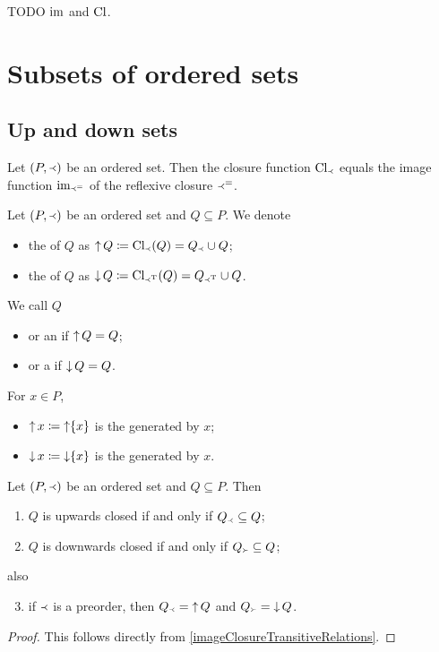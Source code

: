 TODO $\operatorname{im}$ and $\operatorname{Cl}$.

\section{Subsets of ordered sets}
\subsection{Up and down sets}
\begin{lemma} \label{imageClosureTransitiveRelations}
Let $\left( P, \Yleft \right)$ be an ordered set. Then the closure function $\operatorname{Cl}_{\Yleft}$ equals the image function $\operatorname{im}_{\Yleft^=}$ of the reflexive closure $\Yleft^=$.
\end{lemma}

\begin{definition}
Let $\left( P, \Yleft \right)$ be an ordered set and $Q\subseteq P$. We denote
\begin{itemize}
\item the  of $Q$ as $\operatorname{\uparrow} Q \coloneqq \operatorname{Cl}_{\Yleft}(Q) = Q_{\Yleft} \cup Q$;
\item the  of $Q$ as $\operatorname{\downarrow} Q \coloneqq \operatorname{Cl}_{\Yleft^{\mathrm{T}}}(Q) = Q_{\Yleft^{\mathrm{T}}} \cup Q$.
\end{itemize}
We call $Q$
\begin{itemize}
\item {} or an  if $\operatorname{\uparrow} Q = Q$;
\item {} or a  if $\operatorname{\downarrow} Q = Q$.
\end{itemize}
For $x\in P$,
\begin{itemize}
\item $\operatorname{\uparrow} x \coloneqq \operatorname{\uparrow}\{x\}$ is the  generated by $x$;
\item $\operatorname{\downarrow} x \coloneqq \operatorname{\downarrow}\{x\}$ is the  generated by $x$.
\end{itemize}
\end{definition}

\begin{lemma} \label{upwardDownwardClosure}
Let $\left( P, \Yleft \right)$ be an ordered set and $Q\subseteq P$. Then
\begin{enumerate}
\item $Q$ is upwards closed \textup{if and only if} $Q_\Yleft \subseteq Q$;
\item $Q$ is downwards closed \textup{if and only if} $Q_{\Yright} \subseteq Q$;
\end{enumerate}
also
\begin{enumerate} \setcounter{enumi}{2}
\item if $\Yleft$ is a preorder, then $Q_\Yleft = \operatorname{\uparrow} Q$ and $Q_{\Yright} = \operatorname{\downarrow} Q$.
\end{enumerate}
\end{lemma}
\begin{proof}
This follows directly from \ref{imageClosureTransitiveRelations}.
\end{proof}


